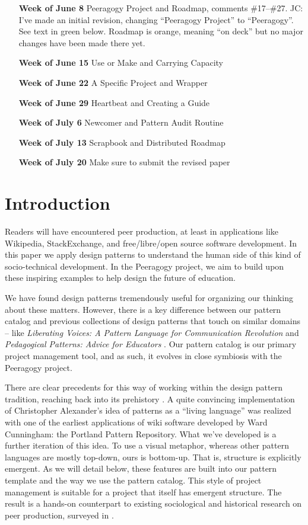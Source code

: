 \begin{itemize}
\item[{\bf Week of June 8}] Peeragogy Project and Roadmap, comments \#17--\#27.  JC: I've made an initial revision, changing ``Peeragogy Project'' to ``Peeragogy''.  See text in green below.  Roadmap is orange, meaning ``on deck'' but no major changes have been made there yet.
\item[{\bf Week of June 15}] Use or Make and Carrying Capacity
\item[{\bf Week of June 22}] A Specific Project and Wrapper
\item[{\bf Week of June 29}] Heartbeat and Creating a Guide
\item[{\bf Week of July 6}] Newcomer and Pattern Audit Routine
\item[{\bf Week of July 13}] Scrapbook and Distributed Roadmap
\item[{\bf Week of July 20}] Make sure to submit the revised paper
\end{itemize}

\section{Introduction}\label{sec:Introduction}

Readers will have encountered peer production, at least in applications like Wikipedia, StackExchange, and free/libre/open source software development.  In this paper we apply design patterns to understand the human side of this kind of socio-technical development.  In the Peeragogy project,  we aim to build upon these inspiring examples to help design the future of education.  

We have found design patterns tremendously useful for organizing our thinking about these matters.  However, there is a key difference between our pattern catalog and previous collections of design patterns that touch on similar domains -- like \emph{Liberating Voices: A Pattern Language for Communication Revolution} \cite{schuler2008liberating} and \emph{Pedagogical Patterns: Advice for Educators} \cite{bergin2012pedagogical}.  Our pattern catalog is our primary project management tool, and as such, it evolves in close symbiosis with the Peeragogy project.

There are clear precedents for this way of working within the design pattern tradition, reaching back into its prehistory \cite{alexander1964notes}.  A quite convincing implementation of Christopher Alexander’s idea of patterns as a ``living language'' \cite[p.~xvii]{alexander1977pattern} was realized with one of the earliest applications of wiki software developed by Ward Cunningham: the Portland Pattern Repository. What we've developed is a further iteration of this idea. To use a visual metaphor, whereas other pattern languages are mostly top-down, ours is bottom-up.  That is, structure is explicitly emergent.  As we will detail below, these features are built into our pattern template and the way we use the pattern catalog.  This style of project management is suitable for a project that itself has emergent structure.  The result is a hands-on counterpart to existing sociological and historical research on peer production, surveyed in \cite{benkler2015peer}.

